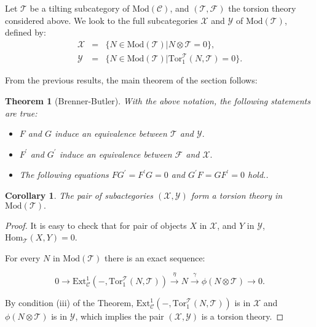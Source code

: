 \documentclass{amsart}
\newtheorem{theorem}{Theorem}
\theoremstyle{plain}
\newtheorem{corollary}{Corollary}
\numberwithin{equation}{section}
\begin{document}
Let $\mathcal{T}$ be a tilting subcategory of $\mathrm{\mathrm{Mod}}(\mathcal{C})$, and $(\mathscr T,\mathscr F)$ the torsion theory considered
above. We look to the full subcategories $\mathscr{X}$ and $\mathscr{Y}$ of $\mathrm{\mathrm{Mod}}(\mathcal{T})$, defined by:
\begin{eqnarray*}
\mathscr{X} &=&\{N\in\mathrm{Mod}(\mathcal{T})|N\otimes \mathcal{T}=0\}\text{,} \\
\mathscr{Y} &=&\{N\in\mathrm{Mod}(\mathcal{T})|\mathrm{Tor}_{1}^{\mathcal{T}}(N,\mathcal{T})=0\}\text{.}
\end{eqnarray*}

From the previous results, the main theorem of the section follows:

\begin{theorem}[Brenner-Butler]
With the above notation, the following statements are true:

\begin{itemize}
\item[(i)] $F$ and $G$ induce an equivalence between $\mathscr{T}$ and $\mathscr{Y}.$

\item[(ii)] $F^{\prime }$ and $G^{\prime }$ induce an equivalence between $\mathscr{F}$ and $\mathscr{X}.$

\item[(iii)] The following equations $FG^{\prime }=F^{\prime }G=0$ and $G^{\prime }F=GF^{\prime }=0$ hold..
\end{itemize}
\end{theorem}

\begin{corollary}
The pair of subactegories $(\mathscr{X},\mathscr{Y})$ form a torsion theory
in $\mathrm{\mathrm{Mod}}(\mathcal{T}).$
\end{corollary}

\begin{proof}
It is easy to check that for pair of objects $X$ in $\mathscr{X}$, and $Y$
in $\mathscr{Y}$, $\mathrm{Hom}_{\mathcal{T}}(X,Y)=0$.

For every $N$ in $\mathrm{\mathrm{Mod}}(\mathcal{T})$ there is an exact
sequence:

\begin{equation*}
0\rightarrow \mathrm{Ext}_{\mathcal{C}}^{1}(-,\mathrm{Tor}_{1}^{\mathcal{T}}(N,\mathcal{T}))\xrightarrow{\eta}N\xrightarrow {\gamma}\phi (N\otimes
\mathcal{T})\rightarrow 0\text{.}
\end{equation*}

By condition (iii) of the Theorem, $\mathrm{Ext}_{\mathcal{C}}^{1}(-,\mathrm{Tor}_{1}^{\mathcal{T}}(N,\mathcal{T}))$ is in $\mathscr{X}$ and $\phi
(N\otimes \mathcal{T})$ is in $\mathscr{Y}$, which implies the pair $(\mathscr{X},\mathscr{Y})$ is a torsion theory.
\end{proof}
\end{document}
